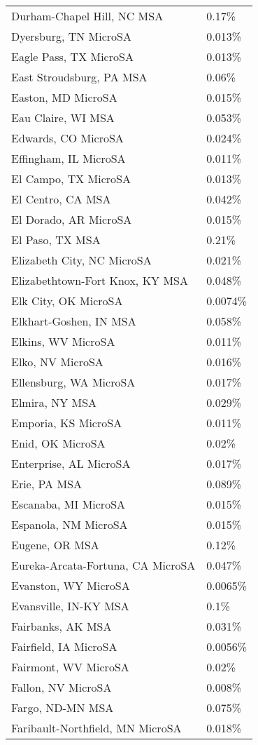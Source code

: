 \begin{longtable}[]{@{}ll@{}}
Durham-Chapel Hill, NC MSA & 0.17\% \\
Dyersburg, TN MicroSA & 0.013\% \\
Eagle Pass, TX MicroSA & 0.013\% \\
East Stroudsburg, PA MSA & 0.06\% \\
Easton, MD MicroSA & 0.015\% \\
Eau Claire, WI MSA & 0.053\% \\
Edwards, CO MicroSA & 0.024\% \\
Effingham, IL MicroSA & 0.011\% \\
El Campo, TX MicroSA & 0.013\% \\
El Centro, CA MSA & 0.042\% \\
El Dorado, AR MicroSA & 0.015\% \\
El Paso, TX MSA & 0.21\% \\
Elizabeth City, NC MicroSA & 0.021\% \\
Elizabethtown-Fort Knox, KY MSA & 0.048\% \\
Elk City, OK MicroSA & 0.0074\% \\
Elkhart-Goshen, IN MSA & 0.058\% \\
Elkins, WV MicroSA & 0.011\% \\
Elko, NV MicroSA & 0.016\% \\
Ellensburg, WA MicroSA & 0.017\% \\
Elmira, NY MSA & 0.029\% \\
Emporia, KS MicroSA & 0.011\% \\
Enid, OK MicroSA & 0.02\% \\
Enterprise, AL MicroSA & 0.017\% \\
Erie, PA MSA & 0.089\% \\
Escanaba, MI MicroSA & 0.015\% \\
Espanola, NM MicroSA & 0.015\% \\
Eugene, OR MSA & 0.12\% \\
Eureka-Arcata-Fortuna, CA MicroSA & 0.047\% \\
Evanston, WY MicroSA & 0.0065\% \\
Evansville, IN-KY MSA & 0.1\% \\
Fairbanks, AK MSA & 0.031\% \\
Fairfield, IA MicroSA & 0.0056\% \\
Fairmont, WV MicroSA & 0.02\% \\
Fallon, NV MicroSA & 0.008\% \\
Fargo, ND-MN MSA & 0.075\% \\
Faribault-Northfield, MN MicroSA & 0.018\% \\

\end{longtable}
